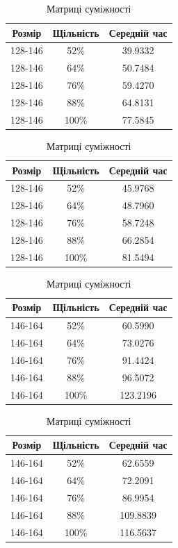 \documentclass[12pt, letterpaper, twoside]{article}
\begin{document}
\begin{table}[htbp]
\begin{minipage}[b]{0.51\linewidth}
\begin{tabular}{|c|c|c|}
\hline
Розмір & Щільність & Середній час\\
\hline
128-146 & 52\% & 39.9332 \\
128-146 & 64\% &50.7484 \\
128-146 & 76\% & 59.4270 \\
128-146 & 88\% & 64.8131 \\
128-146 & 100\% & 77.5845 \\
\hline
\end{tabular}
\caption{Списки суміжності}
\end{minipage}
\begin{minipage}[b]{0.51\linewidth}
\begin{tabular}{|c|c|c|}
\hline
Розмір & Щільність & Середній час\\
\hline
128-146 & 52\% & 45.9768 \\
128-146 & 64\% &48.7960 \\
128-146 & 76\% &58.7248 \\
128-146 & 88\% & 66.2854 \\
128-146 & 100\% & 81.5494 \\
\hline
\end{tabular}
\caption{Матриці суміжності}
\end{minipage}
\end{table}
\begin{table}[htbp]
\begin{minipage}[b]{0.51\linewidth}
\begin{tabular}{|c|c|c|}
\hline
Розмір & Щільність & Середній час\\
\hline
146-164 & 52\% & 60.5990 \\
146-164 & 64\% & 73.0276 \\
146-164 & 76\% & 91.4424 \\
146-164 & 88\% & 96.5072 \\
146-164 & 100\% & 123.2196 \\
\hline
\end{tabular}
\caption{Списки суміжності}
\end{minipage}
\begin{minipage}[b]{0.51\linewidth}
\begin{tabular}{|c|c|c|}
\hline
Розмір & Щільність & Середній час\\
\hline
146-164 & 52\% & 62.6559 \\
146-164 & 64\% & 72.2091 \\
146-164 & 76\% & 86.9954 \\
146-164 & 88\% & 109.8839 \\
146-164 & 100\% & 116.5637 \\
\hline
\end{tabular}
\caption{Матриці суміжності}
\end{minipage}
\end{table}
\end{document}
